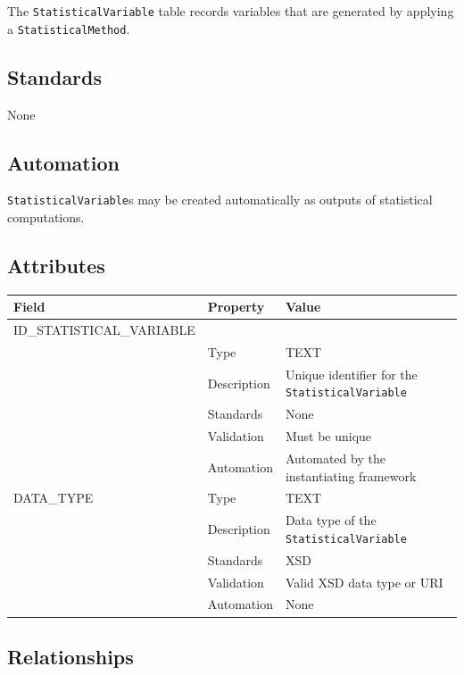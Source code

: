 \documentclass[
]{article}
\newcounter{none}
\begin{document}
The \texttt{StatisticalVariable} table records variables that are
generated by applying a \texttt{StatisticalMethod}.

\subsection{Standards}\label{standards-32}

None

\subsection{Automation}\label{automation-32}

\texttt{StatisticalVariable}s may be created automatically as outputs of
statistical computations.

\subsection{Attributes}\label{attributes-27}

{\def\LTcaptype{none} 
\begin{longtable}[]{@{}lll@{}}
\toprule\noalign{}
Field & Property & Value \\
\midrule\noalign{}
\endhead
\bottomrule\noalign{}
\endlastfoot
ID\_STATISTICAL\_VARIABLE & & \\
& Type & TEXT \\
& Description & Unique identifier for the
\texttt{StatisticalVariable} \\
& Standards & None \\
& Validation & Must be unique \\
& Automation & Automated by the instantiating framework \\
DATA\_TYPE & Type & TEXT \\
& Description & Data type of the \texttt{StatisticalVariable} \\
& Standards & XSD \\
& Validation & Valid XSD data type or URI \\
& Automation & None \\
\end{longtable}
}

\subsection{Relationships}\label{relationships-26}
\end{document}
